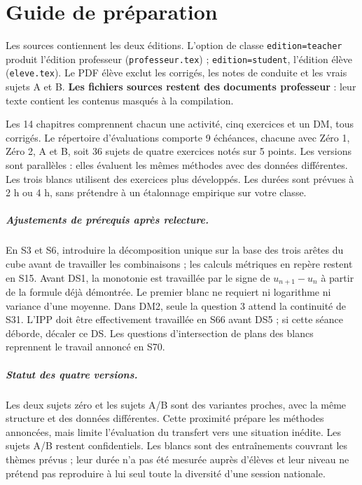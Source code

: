 \chapter*{Guide de préparation}
\begin{teachernote}
Les sources contiennent les deux éditions. L'option de classe \texttt{edition=teacher} produit l'édition professeur (\texttt{professeur.tex}) ; \texttt{edition=student}, l'édition élève (\texttt{eleve.tex}). Le PDF élève exclut les corrigés, les notes de conduite et les vrais sujets A et B. \textbf{Les fichiers sources restent des documents professeur} : leur texte contient les contenus masqués à la compilation.
\end{teachernote}
Les 14 chapitres comprennent chacun une activité, cinq exercices et un DM, tous corrigés. Le répertoire d'évaluations comporte 9 échéances, chacune avec Zéro 1, Zéro 2, A et B, soit 36 sujets de quatre exercices notés sur 5 points. Les versions sont parallèles : elles évaluent les mêmes méthodes avec des données différentes. Les trois blancs utilisent des exercices plus développés. Les durées sont prévues à 2 h ou 4 h, sans prétendre à un étalonnage empirique sur votre classe.
\paragraph{Ajustements de prérequis après relecture.} En S3 et S6, introduire la décomposition unique sur la base des trois arêtes du cube avant de travailler les combinaisons ; les calculs métriques en repère restent en S15. Avant DS1, la monotonie est travaillée par le signe de $u_{n+1}-u_n$ à partir de la formule déjà démontrée. Le premier blanc ne requiert ni logarithme ni variance d'une moyenne. Dans DM2, seule la question 3 attend la continuité de S31. L'IPP doit être effectivement travaillée en S66 avant DS5 ; si cette séance déborde, décaler ce DS. Les questions d'intersection de plans des blancs reprennent le travail annoncé en S70.
\paragraph{Statut des quatre versions.} Les deux sujets zéro et les sujets A/B sont des variantes proches, avec la même structure et des données différentes. Cette proximité prépare les méthodes annoncées, mais limite l'évaluation du transfert vers une situation inédite. Les sujets A/B restent confidentiels. Les blancs sont des entraînements couvrant les thèmes prévus ; leur durée n'a pas été mesurée auprès d'élèves et leur niveau ne prétend pas reproduire à lui seul toute la diversité d'une session nationale.
